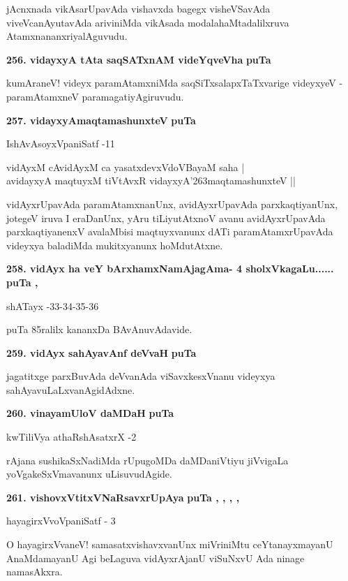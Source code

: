 \smallskip
jAcnxnada vikAsarUpavAda vishavxda bagegx visheVSavAda viveVcanAyutavAda ariviniMda vikAsada modalahaMtadalilxruva AtamxnananxriyalAguvudu.

\medskip
\noindent
\textbf{256. vidayxyA tAta saqSATxnAM videYqveVha} \hfill{\bf puTa \pageref{86}}

\smallskip
kumAraneV! videyx paramAtamxniMda saqSiTxsalapxTaTxvarige videyxyeV - paramAtamxneV paramagatiyAgiruvudu.

\medskip
\noindent
\textbf{257. vidayxyAmaqtamashunxteV} \hfill{\bf puTa \pageref{86}}

\hfill{IshAvAsoyxVpaniSatf -11}

\begin{shloka}
vidAyxM cAvidAyxM ca yasatxdevxVdoVBayaM saha |\\
avidayxyA maqtuyxM tiVtAvxR vidayxyA\char'263maqtamashunxteV ||
\end{shloka}

\smallskip
vidAyxrUpavAda paramAtamxnanUnx, avidAyxrUpavAda parxkaqtiyanUnx, jotegeV iruva I era\-Da\-nUnx, yAru tiLiyutAtxnoV avanu avidAyxrUpavAda parxkaqti\-yanenxV avalaMbisi maqtuyxvanunx dATi para\-mAtamx\-rUpavAda videyxya baladiMda mukitxyanunx hoMdutAtxne.

\medskip
\noindent
\textbf{258. vidAyx ha veY bArxhamxNamAjagAma- 4 sholxVkagaLu......} \hfill{\bf puTa \pageref{48}, \pageref{85}}

\hfill{shATayx -33-34-35-36}

\smallskip
puTa 85ralilx kananxDa BAvAnuvAdavide.

\medskip
\noindent
\textbf{259. vidAyx sahAyavAnf deVvaH} \hfill{\bf puTa \pageref{86}}

\smallskip
jagatitxge parxBuvAda deVvanAda viSavxkesxVnanu videyxya sahAyavuLaLxvanAgidAdxne.

\medskip
\noindent
\textbf{260. vinayamUloV daMDaH} \hfill{\bf puTa \pageref{93}}

\hfill{kwTiliVya athaRshAsatxrX -2}

\smallskip
rAjana sushikaSxNadiMda rUpugoMDa daMDaniVtiyu jiVvigaLa yoVgakeSxVma\-vanunx uLisuvudAgide.

\medskip
\noindent
\textbf{261. vishovxVtitxVNaRsavxrUpAya} \hfill{\bf puTa \pageref{page19c}, \pageref{65}, \pageref{69}, \pageref{102}, \pageref{128}}

\hfill{hayagirxVvoVpaniSatf - 3}

\smallskip
O hayagirxVvaneV! samasatxvishavxvanUnx miVriniMtu ceYtanayxmayanU AnaMda\-mayanU Agi beLaguva vidAyxrAjanU viSuNxvU Ada ninage namasAkxra.

